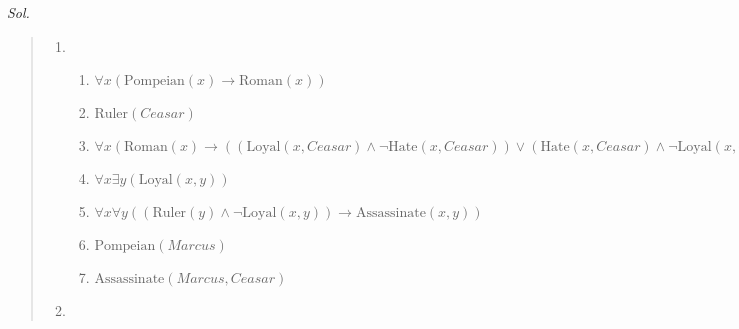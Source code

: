 \documentclass{article}
\theoremstyle{definition}
\newcommand{\<}{\langle}
\renewcommand{\>}{\rangle}
\begin{document}
\begin{enumerate}[label=\textbf{\arabic*.}]
  \vspace{1em} 
  \textit{ Sol. }
  \begin{quote}
  \begin{enumerate}
    \item 

      \begin{enumerate}
        \item $\forall x(\text{Pompeian}(x) \rightarrow \text{Roman}(x))$
        \item $\text{Ruler}(Ceasar)$
        \item $\forall x(\text{Roman}(x) \rightarrow ((\text{Loyal}(x,Ceasar) \land \neg \text{Hate}(x,Ceasar)) \lor(\text{Hate}(x,Ceasar) \land \neg \text{Loyal}(x,Ceasar))))$
        \item $\forall x \exists y(\text{Loyal}(x,y))$
        \item $\forall x \forall y((\text{Ruler}(y) \land \neg \text{Loyal}(x,y)) \rightarrow \text{Assassinate}(x,y))$
        \item $\text{Pompeian}(Marcus)$
        \item $\text{Assassinate}(Marcus,Ceasar)$
      \end{enumerate}
      \vspace{0.5em}
    \item


\end{enumerate}
\end{quote}
\end{enumerate}
\end{document}
